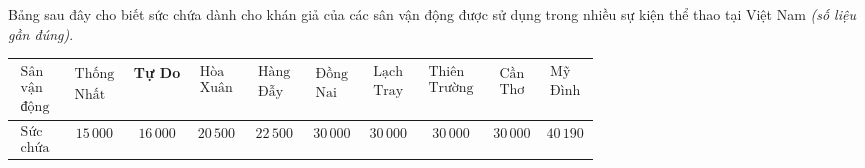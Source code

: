 \begin{bt}%
	Bảng sau đây cho biết sức chứa dành cho khán giả của các sân vận động được sử dụng trong nhiều sự kiện thể thao tại Việt Nam \textit{(số liệu gần đúng)}.
	\begin{center}
		\begin{tabular}{|c|c|c|c|c|c|c|c|c|c|}
			\hline
			$\begin{array}{*{20}{c}}
				\text{Sân}\\
				\text{vận}\\
				\text{động}
			\end{array}$ 
			& $\begin{array}{*{20}{c}}
				\text{Thống}\\
				\text{Nhất}
			\end{array}$ 
			& Tự Do
			& $\begin{array}{*{20}{c}}
				\text{Hòa}\\
				\text{Xuân}
			\end{array}$ 
			& $\begin{array}{*{20}{c}}
				\text{Hàng}\\
				\text{Đẫy}
			\end{array}$ 
			& $\begin{array}{*{20}{c}}
				\text{Đồng}\\
				\text{Nai}
			\end{array}$ 
			& $\begin{array}{*{20}{c}}
				\text{Lạch}\\
				\text{Tray}
			\end{array}$ 
			& $\begin{array}{*{20}{c}}
				\text{Thiên}\\
				\text{Trường}
			\end{array}$
			& $\begin{array}{*{20}{c}}
				\text{Cần}\\
				\text{Thơ}
			\end{array}$
			& $\begin{array}{*{20}{c}}
				\text{Mỹ}\\
				\text{Đình}
			\end{array}$\\
			\hline
			$\begin{array}{*{20}{c}}
				\text{Sức}\\
				\text{chứa}
			\end{array}$ & $15\,000$ & $16\,000$ & $20\,500$ & $22\,500$ & $30\,000$ & $30\,000$ & $30\,000$ & $30\,000$ & $40\,190$\\

\end{tabular}
\end{center}
\end{bt}
